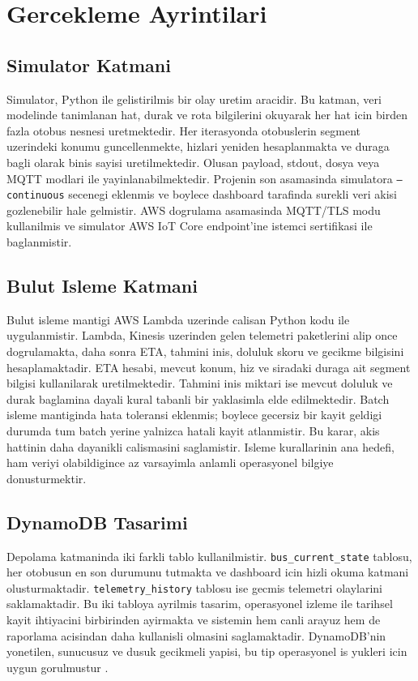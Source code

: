 \section{Gercekleme Ayrintilari}

\subsection{Simulator Katmani}

Simulator, Python ile gelistirilmis bir olay uretim aracidir. Bu katman, veri modelinde tanimlanan hat, durak ve rota bilgilerini okuyarak her hat icin birden fazla otobus nesnesi uretmektedir. Her iterasyonda otobuslerin segment uzerindeki konumu guncellenmekte, hizlari yeniden hesaplanmakta ve duraga bagli olarak binis sayisi uretilmektedir. Olusan payload, stdout, dosya veya MQTT modlari ile yayinlanabilmektedir. Projenin son asamasinda simulatora \texttt{--continuous} secenegi eklenmis ve boylece dashboard tarafinda surekli veri akisi gozlenebilir hale gelmistir. AWS dogrulama asamasinda MQTT/TLS modu kullanilmis ve simulator AWS IoT Core endpoint'ine istemci sertifikasi ile baglanmistir.

\subsection{Bulut Isleme Katmani}

Bulut isleme mantigi AWS Lambda uzerinde calisan Python kodu ile uygulanmistir. Lambda, Kinesis uzerinden gelen telemetri paketlerini alip once dogrulamakta, daha sonra ETA, tahmini inis, doluluk skoru ve gecikme bilgisini hesaplamaktadir. ETA hesabi, mevcut konum, hiz ve siradaki duraga ait segment bilgisi kullanilarak uretilmektedir. Tahmini inis miktari ise mevcut doluluk ve durak baglamina dayali kural tabanli bir yaklasimla elde edilmektedir. Batch isleme mantiginda hata toleransi eklenmis; boylece gecersiz bir kayit geldigi durumda tum batch yerine yalnizca hatali kayit atlanmistir. Bu karar, akis hattinin daha dayanikli calismasini saglamistir. Isleme kurallarinin ana hedefi, ham veriyi olabildigince az varsayimla anlamli operasyonel bilgiye donusturmektir.

\subsection{DynamoDB Tasarimi}

Depolama katmaninda iki farkli tablo kullanilmistir. \texttt{bus\_current\_state} tablosu, her otobusun en son durumunu tutmakta ve dashboard icin hizli okuma katmani olusturmaktadir. \texttt{telemetry\_history} tablosu ise gecmis telemetri olaylarini saklamaktadir. Bu iki tabloya ayrilmis tasarim, operasyonel izleme ile tarihsel kayit ihtiyacini birbirinden ayirmakta ve sistemin hem canli arayuz hem de raporlama acisindan daha kullanisli olmasini saglamaktadir. DynamoDB'nin yonetilen, sunucusuz ve dusuk gecikmeli yapisi, bu tip operasyonel is yukleri icin uygun gorulmustur \cite{dynamodb_intro}.

